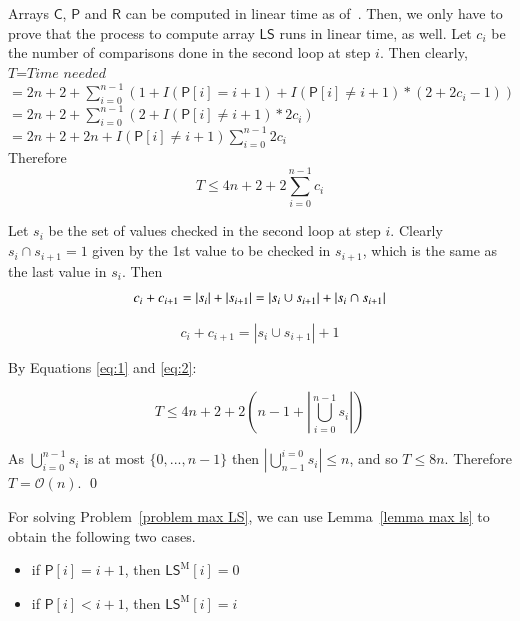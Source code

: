 \documentclass[preprint,12pt]{elsarticle}
\newcommand{\carr}{\textsf{C}}      %
\newcommand{\sarr}{\textsf{LS}}      %
\newcommand{\smarr}{\textsf{LS}^\mathrm{M}}      %
\newcommand{\parr}{\textsf{P}}      %
\newcommand{\rarr}{\textsf{R}}      %
\newcommand{\cO}{\ensuremath{\mathcal{O}}}
\newenvironment{proof}[1][Proof]{\begin{trivlist}
\item[\hskip \labelsep {\bfseries #1}]}{\end{trivlist}}
\begin{document}
\begin{proof}
Arrays $\carr$, $\parr$ and $\rarr$ can be computed in linear time as of~\cite{CL07,KMP,DBLP:conf/birthday/ApostolicoB97,DBLP:journals/ipl/Breslauer92}.
Then, we only have to prove that the process to compute array $\sarr$ runs in linear time,
as well. Let $c_{i}$ be the number of comparisons done in the second loop at step $i$. Then clearly,\\
$\textit{T=Time needed}$\\
$=2n+2+\sum^{n-1}_{i=0}(1+I(\parr[i]=i+1)+I(\parr[i]\neq i+1)*(2+2c_{i}-1))$\\
$=2n+2+\sum^{n-1}_{i=0} (2+I(\parr[i]\neq i+1)*2c_{i})$\\
$=2n+2+2n +I(\parr[i]\neq i+1) \sum^{n-1}_{i=0}2c_{i}$\\
Therefore
\begin{equation}
T \leq 4n+2+2\sum^{n-1}_{i=0}c_{i}
\label{eq:1}
\end{equation}

Let $s_{i}$ be the set of values checked in the second loop at step $i$. Clearly  $s_{i} \cap s_{i+1} = 1$ given by the 1st value
to be checked in $s_{i+1}$, which is the same as the last value in $s_{i}$. Then
\begin{equation}
c_{i} + c_{i+1}= |s_{i}| + |s_{i+1}| = |s_{i} \cup s_{i+1}| +  |s_{i} \cap s_{i+1}|\\
\end{equation}

\begin{equation}
c_{i} + c_{i+1}= |s_{i} \cup s_{i+1}| +  1
\label{eq:2}
\end{equation}

By Equations \ref{eq:1} and \ref{eq:2}:

\begin{equation}
T \leq 4n+2+2(n-1+|\bigcup^{n-1}_{i=0}s_{i}| )
\label{eq:3}
\end{equation}

As $\bigcup^{n-1}_{i=0}s_{i}$ is at most $\{0,...,n-1\}$ then $|\bigcup^{i=0}_{n-1}s_{i}| \leq n$, and so $T \leq 8n$.
Therefore $T=\cO(n)$. \qed
\end{proof}


For solving Problem~\ref{problem max LS}, we can use Lemma~\ref{lemma max ls} to obtain the following two cases.

\begin{itemize}
 \item if $\parr[i]=i+1$, then $\smarr[i]=0$
 \item if $\parr[i]<i+1$, then $\smarr[i]=i$
\end{itemize}
\end{document}
